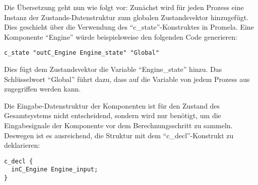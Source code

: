 Die Übersetzung geht nun wie folgt vor:
Zunächst wird für jeden Prozess eine Instanz der Zustands-Datenstruktur zum globalen Zustandsvektor hinzugefügt.
Dies geschieht über die Verwendung des "`c\_state"'-Konstruktes in Promela.
Eine Komponente "`Engine"' würde beispielsweise den folgenden Code generieren:
\begin{lstlisting}[language=promela]
c_state "outC_Engine Engine_state" "Global"
\end{lstlisting}
Dies fügt dem Zustandsvektor die Variable "`Engine\_state"' hinzu.
Das Schlüsselwort "`Global"' führt dazu, dass auf die Variable von jedem Prozess aus zugegriffen werden kann.

Die Eingabe-Datenstruktur der Komponenten ist für den Zustand des Gesamtsystems nicht entscheidend, sondern wird nur benötigt, um die Eingabesignale der Komponente vor dem Berechnungsschritt zu sammeln.
Deswegen ist es ausreichend, die Struktur mit dem "`c\_decl"'-Konstrukt zu deklarieren:
\begin{lstlisting}[language=promela]
c_decl {
  inC_Engine Engine_input;
}
\end{lstlisting}

